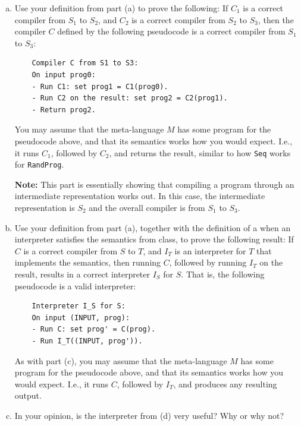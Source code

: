 \documentclass{article}
\theoremstyle{plain}
\begin{document}
\begin{enumerate}
\begin{enumerate}[(a)]
Use your definition from part (a) to prove or disprove the following:
Regardless of the semantics of $S$, and even if $S$ is nondeterministic,
a do-nothing compiler is a valid compiler from $S$ to itself.
Check that your result agrees with your intuition and make any edits to your definition if needed.

\item
Use your definition from part (a) to prove the following:
If $C_1$ is a correct compiler from $S_1$ to $S_2$, and $C_2$ is a correct compiler from $S_2$ to $S_3$, then the compiler $C$ defined by the following pseudocode is a correct compiler from $S_1$ to $S_3$:
\begin{verbatim}
    Compiler C from S1 to S3:
    On input prog0:
    - Run C1: set prog1 = C1(prog0).
    - Run C2 on the result: set prog2 = C2(prog1).
    - Return prog2.
\end{verbatim}

You may assume that the meta-language $M$ has some program for the pseudocode above, and that its semantics works how you would expect.
I.e., it runs $C_1$, followed by $C_2$, and returns the result, similar to how \texttt{Seq} works for \texttt{RandProg}.

\textbf{Note:} This part is essentially showing that compiling a program through an intermediate representation works out. In this case,
the intermediate representation is $S_2$ and the overall compiler is from $S_1$ to $S_3$.

\item
Use your definition from part (a),
together with the definition of a when an interpreter satisfies the semantics from class,
to prove the following result:
If $C$ is a correct compiler from $S$ to $T$, and $I_T$ is an interpreter for $T$ that implements the semantics, then
running $C$, followed by running $I_T$ on the result, results in a correct interpreter $I_S$ for $S$.
That is, the following pseudocode is a valid interpreter:
\begin{verbatim}
    Interpreter I_S for S:
    On input (INPUT, prog):
    - Run C: set prog' = C(prog).
    - Run I_T((INPUT, prog')).
\end{verbatim}

As with part (c), you may assume that the meta-language $M$ has some program for the pseudocode above, and that its semantics works how you would expect.
I.e., it runs $C$, followed by $I_T$, and produces any resulting output.

\item
In your opinion, is the interpreter from (d) very useful? Why or why not?
\end{enumerate}


\end{enumerate}
\end{document}
